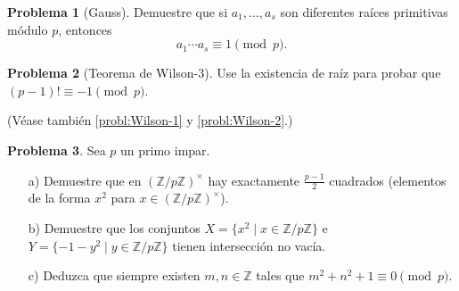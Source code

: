 \documentclass{article}
\newcommand{\ZZ}{\mathbb{Z}}
\theoremstyle{definition}
\newtheorem{problema}{Problema}[section]
\begin{document}
\begin{problema}[Gauss]
  Demuestre que si $a_1, \ldots, a_s$ son diferentes raíces primitivas módulo
  $p$, entonces
  $$a_1 \cdots a_s \equiv 1 \pmod{p}.$$
\end{problema}

\begin{problema}[Teorema de Wilson-3]
  Use la existencia de raíz para probar que $(p-1)! \equiv -1 \pmod{p}$.

  (Véase también \ref{probl:Wilson-1} y \ref{probl:Wilson-2}.)
\end{problema}

\begin{problema}
  Sea $p$ un primo impar.

  \begin{enumerate}
  \item[a)] Demuestre que en $(\ZZ/p\ZZ)^\times$ hay exactamente $\frac{p-1}{2}$
    cuadrados (elementos de la forma $x^2$ para $x \in (\ZZ/p\ZZ)^\times$).

  \item[b)] Demuestre que los conjuntos $X = \{ x^2 \mid x \in \ZZ/p\ZZ \}$ e
    $Y = \{ -1-y^2 \mid y \in \ZZ/p\ZZ \}$ tienen intersección no vacía.

  \item[c)] Deduzca que siempre existen $m,n \in \ZZ$ tales que
    $m^2 + n^2 + 1 \equiv 0 \pmod{p}$.
  \end{enumerate}
\end{problema}
\end{document}
